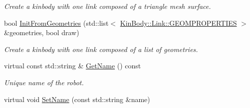 \begin{DoxyCompactItemize}
\begin{DoxyCompactList}\small\item\em Create a kinbody with one link composed of a triangle mesh surface. \item\end{DoxyCompactList}\item 
bool \hyperlink{classOpenRAVE_1_1KinBody_ab0b57544b54f5b7d766a3fee473667a5}{InitFromGeometries} (std::list$<$ \hyperlink{classOpenRAVE_1_1KinBody_1_1Link_1_1GEOMPROPERTIES}{KinBody::Link::GEOMPROPERTIES} $>$ \&geometries, bool draw)
\begin{DoxyCompactList}\small\item\em Create a kinbody with one link composed of a list of geometries. \item\end{DoxyCompactList}\item 
\hypertarget{classOpenRAVE_1_1KinBody_a3cc720dbc55fa8e07a0f85343d3bb136}{
virtual const std::string \& \hyperlink{classOpenRAVE_1_1KinBody_a3cc720dbc55fa8e07a0f85343d3bb136}{GetName} () const }
\label{classOpenRAVE_1_1KinBody_a3cc720dbc55fa8e07a0f85343d3bb136}

\begin{DoxyCompactList}\small\item\em Unique name of the robot. \item\end{DoxyCompactList}\item 
\hypertarget{classOpenRAVE_1_1KinBody_a847d2f81d14b0005954aeb0d817a2187}{
virtual void \hyperlink{classOpenRAVE_1_1KinBody_a847d2f81d14b0005954aeb0d817a2187}{SetName} (const std::string \&name)}
\label{classOpenRAVE_1_1KinBody_a847d2f81d14b0005954aeb0d817a2187}


\end{DoxyCompactItemize}
